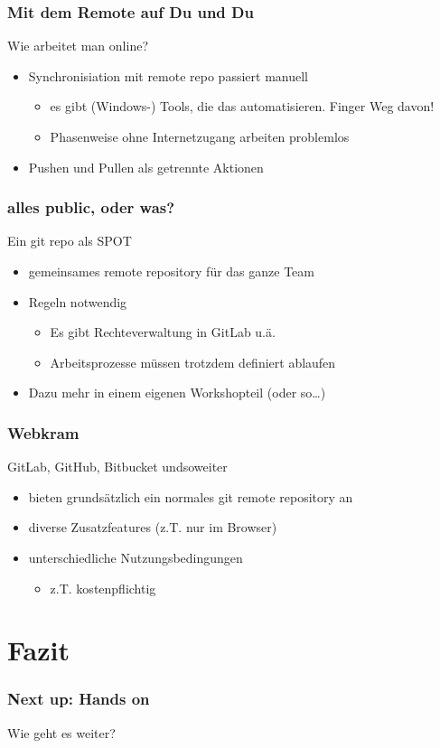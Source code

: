 \documentclass{beamer}
\begin{document}
\begin{frame}
	\frametitle{Mit dem Remote auf Du und Du}
	\begin{block}{Wie arbeitet man online?}
		\begin{itemize}
			\item Synchronisiation mit remote repo passiert manuell
				\pause
				\begin{itemize}
					\item es gibt (Windows-) Tools, die das automatisieren. Finger Weg davon!
					\item Phasenweise ohne Internetzugang arbeiten problemlos
				\end{itemize}
				\pause
			\item Pushen und Pullen als getrennte Aktionen
		\end{itemize}
	\end{block}
\end{frame}

\begin{frame}
	\frametitle{alles public, oder was?}
	\begin{block}{Ein git repo als SPOT}
		\begin{itemize}
			\item gemeinsames remote repository für das ganze Team
				\pause
			\item Regeln notwendig
				\pause
				\begin{itemize}
					\item Es gibt Rechteverwaltung in GitLab u.ä.
					\item Arbeitsprozesse müssen trotzdem definiert ablaufen
				\end{itemize}
				\pause
			\item Dazu mehr in einem eigenen Workshopteil (oder so…)
		\end{itemize}
	\end{block}
\end{frame}

\begin{frame}
	\frametitle{Webkram}
	\begin{block}{GitLab, GitHub, Bitbucket undsoweiter}
		\begin{itemize}
			\item bieten grundsätzlich ein normales git remote repository an
			\item diverse Zusatzfeatures (z.T. nur im Browser)
			\item unterschiedliche Nutzungsbedingungen
				\begin{itemize}
					\item z.T. kostenpflichtig
				\end{itemize}
		\end{itemize}
	\end{block}
\end{frame}

\section{Fazit}

\begin{frame}
	\frametitle{Next up: Hands on}
	\begin{center}
		Wie geht es weiter?
	\end{center}
\end{frame}


\end{document}
